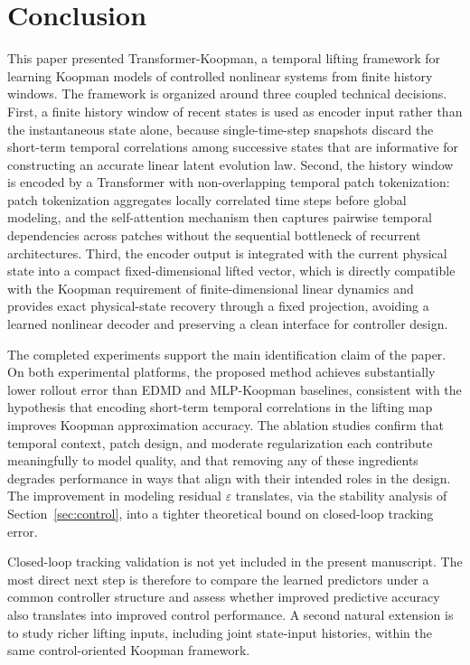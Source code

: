 \documentclass[journal]{IEEEtran}
\begin{document}
\section{Conclusion}
\label{sec:conclusion}

This paper presented Transformer-Koopman, a temporal lifting framework for learning Koopman models of controlled nonlinear systems from finite history windows. The framework is organized around three coupled technical decisions. First, a finite history window of recent states is used as encoder input rather than the instantaneous state alone, because single-time-step snapshots discard the short-term temporal correlations among successive states that are informative for constructing an accurate linear latent evolution law. Second, the history window is encoded by a Transformer with non-overlapping temporal patch tokenization: patch tokenization aggregates locally correlated time steps before global modeling, and the self-attention mechanism then captures pairwise temporal dependencies across patches without the sequential bottleneck of recurrent architectures. Third, the encoder output is integrated with the current physical state into a compact fixed-dimensional lifted vector, which is directly compatible with the Koopman requirement of finite-dimensional linear dynamics and provides exact physical-state recovery through a fixed projection, avoiding a learned nonlinear decoder and preserving a clean interface for controller design.

The completed experiments support the main identification claim of the paper. On both experimental platforms, the proposed method achieves substantially lower rollout error than EDMD and MLP-Koopman baselines, consistent with the hypothesis that encoding short-term temporal correlations in the lifting map improves Koopman approximation accuracy. The ablation studies confirm that temporal context, patch design, and moderate regularization each contribute meaningfully to model quality, and that removing any of these ingredients degrades performance in ways that align with their intended roles in the design. The improvement in modeling residual $\varepsilon$ translates, via the stability analysis of Section~\ref{sec:control}, into a tighter theoretical bound on closed-loop tracking error.

Closed-loop tracking validation is not yet included in the present manuscript. The most direct next step is therefore to compare the learned predictors under a common controller structure and assess whether improved predictive accuracy also translates into improved control performance. A second natural extension is to study richer lifting inputs, including joint state-input histories, within the same control-oriented Koopman framework.
\end{document}
